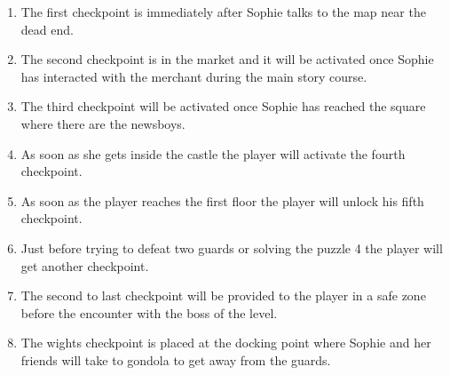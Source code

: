 \begin{enumerate}
 \item The first checkpoint is immediately after Sophie talks to the map near the dead end.
 \item The second checkpoint is in the market and it will be activated once Sophie has interacted with the merchant during the main story course.
 \item The third checkpoint will be activated once Sophie has reached the square where there are the newsboys.
 \item As soon as she gets inside the castle the player will activate the fourth checkpoint.
 \item As soon as the player reaches the first floor the player will unlock his fifth checkpoint.
 \item Just before trying to defeat two guards or solving the puzzle 4  the player will get another checkpoint.
 \item The second to last checkpoint will be provided to the player in a safe zone before the encounter with the boss of the level.
 \item The wights checkpoint is placed at the docking point where Sophie and her friends will take to gondola to get away from the guards.
\end{enumerate}
